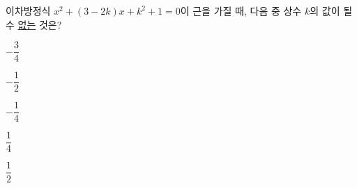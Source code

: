 이차방정식 $x^2+(3-2k)x+k^2+1=0$이 근을 가질 때, 다음 중 상수 $k$의 값이 될 수 \underline{없는} 것은?
\begin{choices32}{\rule[-3ex]{0pt}{8ex}$-\dfrac{3}{4}$}{\rule[-3ex]{0pt}{8ex}$-\dfrac{1}{2}$}{\rule[-3ex]{0pt}{8ex}$-\dfrac{1}{4}$}{\rule[-3ex]{0pt}{8ex}$\dfrac{1}{4}$}{\rule[-3ex]{0pt}{8ex}$\dfrac{1}{2}$}\end{choices32}
